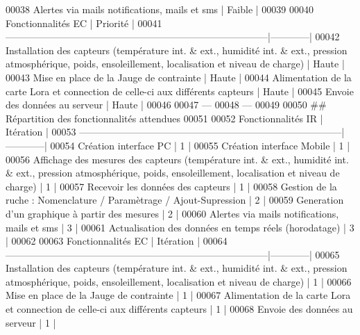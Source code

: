 \begin{DoxyCode}
00038 Alertes via mails notifications, mails et sms                                    |  Faible    |
00039 
00040 Fonctionnalités EC                                                               |  Priorité  |
00041 ---------------------------------------------------------------------------------|------------|
00042 Installation des capteurs (température int. & ext., humidité int. & ext., pression atmosphérique,
       poids, ensoleillement, localisation et niveau de charge)                         |  Haute     |
00043 Mise en place de la Jauge de contrainte                                          |  Haute     |
00044 Alimentation de la carte Lora et connection de celle-ci aux différents capteurs  |  Haute     |
00045 Envoie des données au serveur                                                    |  Haute     |
00046 
00047 ---
00048 ---
00049 
00050 ## Répartition des fonctionnalités attendues
00051 
00052 Fonctionnalités IR                                                               | Itération  |
00053 ---------------------------------------------------------------------------------|------------|
00054 Création interface PC                                                            |  1         |
00055 Création interface Mobile                                                        |  1         |
00056 Affichage des mesures des capteurs (température int. & ext., humidité int. & ext., pression
       atmosphérique, poids, ensoleillement, localisation et niveau de charge)                                               
                                 |  1         |
00057 Recevoir les données des capteurs                                                |  1         |
00058 Gestion de la ruche : Nomenclature / Paramètrage / Ajout-Supression              |  2         |
00059 Generation d'un graphique à partir des mesures                                   |  2         |
00060 Alertes via mails notifications, mails et sms                                    |  3         |
00061 Actualisation des données en temps réels (horodatage)                            |  3         |
00062 
00063 Fonctionnalités EC                                                               | Itération  |
00064 ---------------------------------------------------------------------------------|------------|
00065 Installation des capteurs (température int. & ext., humidité int. & ext., pression atmosphérique,
       poids, ensoleillement, localisation et niveau de charge)                         |  1         |
00066 Mise en place de la Jauge de contrainte                                          |  1         |
00067 Alimentation de la carte Lora et connection de celle-ci aux différents capteurs  |  1         |
00068 Envoie des données au serveur                                                    |  1         |
\end{DoxyCode}
